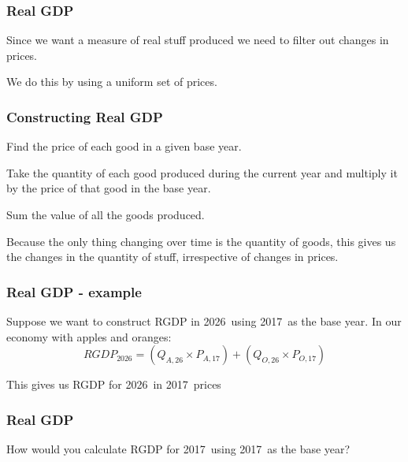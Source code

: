 \documentclass[aspectratio=169]{beamer}
\newenvironment{wideitemize}{\itemize\addtolength{\itemsep}{10pt}}{\enditemize}
\newcommand{\thisyear}{2026}
\newcommand{\baseyear}{2017}
\newcommand{\baseyearshort}{17}
\newcommand{\thisyearshort}{26}
\begin{document}
\begin{frame}
\frametitle{Real GDP}
\begin{wideitemize}
\item Since we want a measure of real stuff produced we need to filter out changes in prices.
\item We do this by using a uniform set of prices.
\end{wideitemize}

\end{frame}


\begin{frame}
\frametitle{Constructing Real GDP}
\begin{wideitemize}
\item Find the price of each good in a given base year.
\item Take the quantity of each good produced during the current year and multiply it by the price of that good in the base year.
\item Sum the value of all the goods produced.
\item Because the only thing changing over time is the quantity of goods, this gives us the changes in the quantity of stuff, irrespective of changes in prices.
\end{wideitemize}
\end{frame}


\begin{frame}
\frametitle{Real GDP - example}
\begin{wideitemize}
\item Suppose we want to construct RGDP in \thisyear \  using \baseyear \ as the base year.  In our economy with apples and oranges:
\begin{equation*}
RGDP_{\thisyear} = (Q_{A,\thisyearshort} \times P_{A,\baseyearshort})+(Q_{O,\thisyearshort} \times P_{O,\baseyearshort})
\end{equation*}
\item This gives us RGDP for \thisyear \  in \baseyear \ prices
\end{wideitemize}

\end{frame}


\begin{frame}
\frametitle{Real GDP}
\begin{wideitemize}
\item How would you calculate RGDP for \baseyear \ using \baseyear \ as the base year?
\end{wideitemize}

\end{frame}
\end{document}
